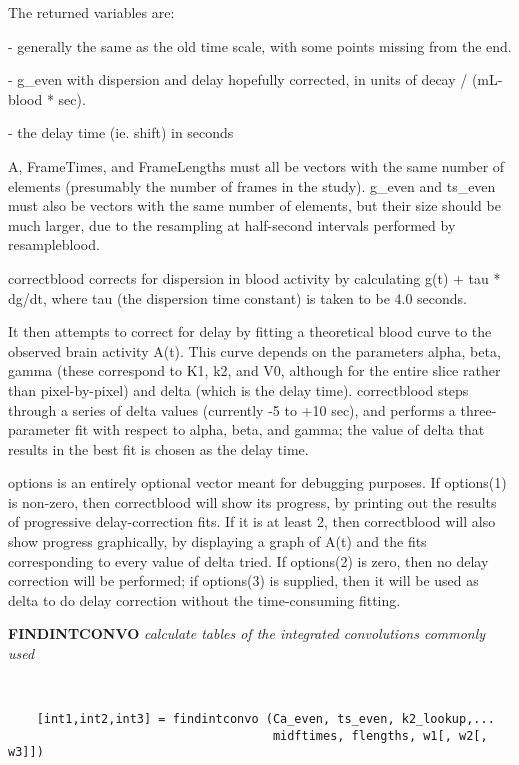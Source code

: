    The returned variables are:
\begin{description}
\item {} - generally the same as the old time scale,
                     with some points missing from the end.
\item {} - g\_even with dispersion and delay hopefully corrected,
                 in units of decay / (mL-blood * sec).  
\item {} - the delay time (ie. shift) in seconds
\end{description}
 
   A, FrameTimes, and FrameLengths must all be vectors with the same
   number of elements (presumably the number of frames in the study).
   g\_even and ts\_even must also be vectors with the same number of
   elements, but their size should be much larger, due to the
   resampling at half-second intervals performed by resampleblood.
   
   correctblood corrects for dispersion in blood activity by
   calculating g(t) + tau * dg/dt, where tau (the dispersion time
   constant) is taken to be 4.0 seconds.
 
   It then attempts to correct for delay by fitting a theoretical blood
   curve to the observed brain activity A(t).  This curve depends
   on the parameters alpha, beta, gamma (these correspond to K1, k2,
   and V0, although for the entire slice rather than pixel-by-pixel) and
   delta (which is the delay time).  correctblood steps through a series
   of delta values (currently -5 to +10 sec), and performs a three-
   parameter fit with respect to alpha, beta, and gamma; the value of
   delta that results in the best fit is chosen as the delay time.
 
   options is an entirely optional vector meant for debugging purposes.
   If options(1) is non-zero, then correctblood will show its progress,
   by printing out the results of progressive delay-correction fits.  If 
   it is at least 2, then correctblood will also show progress graphically,
   by displaying a graph of A(t) and the fits corresponding to every
   value of delta tried.  If options(2) is zero, then no delay correction
   will be performed; if options(3) is supplied, then it will be
   used as delta to do delay correction without the time-consuming
   fitting.
\newpage


{\large\bf FINDINTCONVO} {\em   calculate tables of the integrated convolutions commonly used}
\begin{verbatim}


    [int1,int2,int3] = findintconvo (Ca_even, ts_even, k2_lookup,...
                                     midftimes, flengths, w1[, w2[, w3]])


\end{verbatim}

